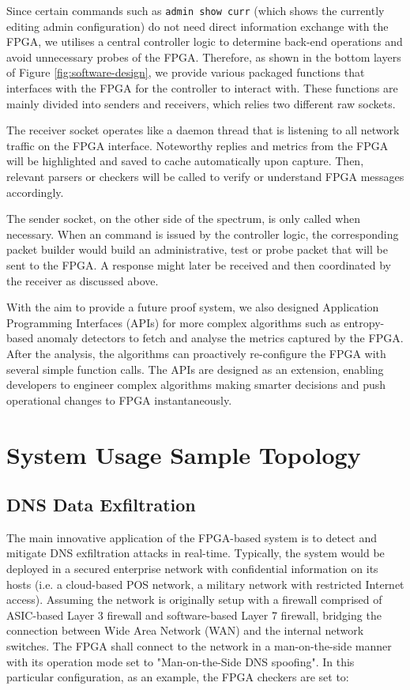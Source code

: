 \documentclass[a4paper]{report}
\newcommand{\code}{\texttt}
\begin{document}
Since certain commands such as \code{admin show curr} (which shows the currently editing admin configuration) do not need direct information exchange with the FPGA, we utilises a central controller logic to determine back-end operations and avoid unnecessary probes of the FPGA. Therefore, as shown in the bottom layers of Figure \ref{fig:software-design}, we provide various packaged functions that interfaces with the FPGA for the controller to interact with. These functions are mainly divided into senders and receivers, which relies two different raw sockets.

The receiver socket operates like a daemon thread that is listening to all network traffic on the FPGA interface. Noteworthy replies and metrics from the FPGA will be highlighted and saved to cache automatically upon capture. Then, relevant parsers or checkers will be called to verify or understand FPGA messages accordingly. 

The sender socket, on the other side of the spectrum, is only called when necessary. When an command is issued by the controller logic, the corresponding packet builder would build an administrative, test or probe packet that will be sent to the FPGA. A response might later be received and then coordinated by the receiver as discussed above.

With the aim to provide a future proof system, we also designed Application Programming Interfaces (APIs) for more complex algorithms such as entropy-based anomaly detectors to fetch and analyse the metrics captured by the FPGA. After the analysis, the algorithms can proactively re-configure the FPGA with several simple function calls. The APIs are designed as an extension, enabling developers to engineer complex algorithms making smarter decisions and push operational changes to FPGA instantaneously.

\section{System Usage Sample Topology}

\subsection{DNS Data Exfiltration}

The main innovative application of the FPGA-based system is to detect and mitigate DNS exfiltration attacks in real-time. Typically, the system would be deployed in a secured enterprise network with confidential information on its hosts (i.e. a cloud-based POS network, a military network with restricted Internet access). Assuming the network is originally setup with a firewall comprised of ASIC-based Layer 3 firewall and software-based Layer 7 firewall, bridging the connection between Wide Area Network (WAN) and the internal network switches. The FPGA shall connect to the network in a man-on-the-side manner with its operation mode set to "Man-on-the-Side DNS spoofing".  In this particular configuration, as an example, the FPGA checkers are set to:
\end{document}
